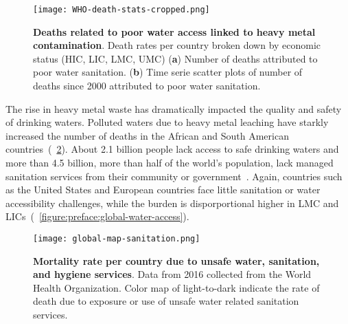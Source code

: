\documentclass[../main/main]{subfiles}
\begin{document}
\begin{figure}[H]
	\centering
	\texttt{[image: WHO-death-stats-cropped.png]}
	\caption[Deaths related to poor water access linked to heavy metal contamination]
	{
    \textbf{Deaths related to poor water access linked to heavy metal contamination}\protect\footnotemark.
		Death rates per country broken down by economic status (HIC, LIC, LMC, UMC)
    (\textbf{a}) Number of deaths attributed to poor water sanitation.
    (\textbf{b}) Time serie scatter plots of number of deaths since 2000 attributed to poor water sanitation.
  }
  \label{figure:preface:WHO-death-stats}
\end{figure}

The rise in heavy metal waste has dramatically impacted the quality and safety of drinking waters. Polluted waters due to heavy metal leaching have starkly increased the number of deaths in the African and South American countries~(\FIGURE~\ref{figure:preface:global-water-sanitation}). About 2.1 billion people lack access to safe drinking waters and more than 4.5 billion, more than half of the world's population, lack managed sanitation services from their community or government~\cite{unitednations2015,unu-inweh2017}.
Again, countries such as the United States and European countries face little sanitation or water accessibility challenges, while the burden is disporportional higher in LMC and LICs~(\FIGURE~\ref{figure:preface:global-water-access}).

\begin{figure}[H]
	\centering
	\texttt{[image: global-map-sanitation.png]}
	\caption[Mortality rate per country due to unsafe water, sanitation, and hygiene services]
	{
		\textbf{Mortality rate per country due to unsafe water, sanitation, and hygiene services}\protect\footnotemark.
		Data from 2016 collected from the World Health Organization. Color map of light-to-dark indicate the rate of death due to exposure or use of unsafe water related sanitation services.
	}
	\label{figure:preface:global-water-sanitation}
\end{figure}
\end{document}
